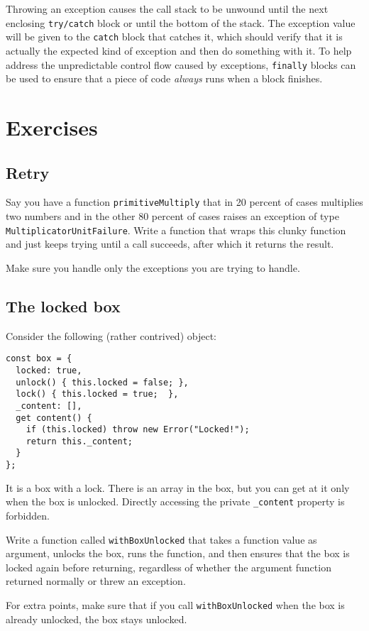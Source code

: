 Throwing an exception causes the call stack to be unwound until the next enclosing \lstinline`try/catch` block or until the bottom of the stack. The exception value will be given to the \lstinline`catch` block that catches it, which should verify that it is actually the expected kind of exception and then do something with it. To help address the unpredictable control flow caused by exceptions, \lstinline`finally` blocks can be used to ensure that a piece of code \emph{always} runs when a block finishes.

\section{Exercises}

\subsection{Retry}

Say you have a function \lstinline`primitiveMultiply` that in 20 percent of cases multiplies two numbers and in the other 80 percent of cases raises an exception of type \lstinline`MultiplicatorUnitFailure`. Write a function that wraps this clunky function and just keeps trying until a call succeeds, after which it returns the result.

Make sure you handle only the exceptions you are trying to handle.

\subsection{The locked box}

Consider the following (rather contrived) object:

\begin{lstlisting}
const box = {
  locked: true,
  unlock() { this.locked = false; },
  lock() { this.locked = true;  },
  _content: [],
  get content() {
    if (this.locked) throw new Error("Locked!");
    return this._content;
  }
};
\end{lstlisting}
\noindent{}

It is a box with a lock. There is an array in the box, but you can get at it only when the box is unlocked. Directly accessing the private \lstinline`_content` property is forbidden.

Write a function called \lstinline`withBoxUnlocked` that takes a function value as argument, unlocks the box, runs the function, and then ensures that the box is locked again before returning, regardless of whether the argument function returned normally or threw an exception.

For extra points, make sure that if you call \lstinline`withBoxUnlocked` when the box is already unlocked, the box stays unlocked.
